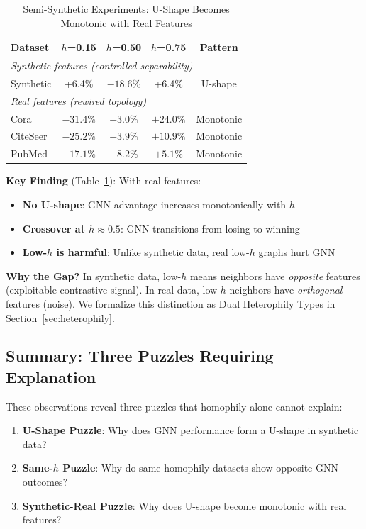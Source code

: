 \begin{table}[t]
\centering
\caption{Semi-Synthetic Experiments: U-Shape Becomes Monotonic with Real Features}
\label{tab:semi_synthetic_obs}
\begin{tabular}{@{}lcccc@{}}
\toprule
\textbf{Dataset} & \textbf{$h$=0.15} & \textbf{$h$=0.50} & \textbf{$h$=0.75} & \textbf{Pattern} \\
\midrule
\multicolumn{5}{l}{\textit{Synthetic features (controlled separability)}} \\
Synthetic & +6.4\% & $-18.6\%$ & +6.4\% & U-shape \\
\midrule
\multicolumn{5}{l}{\textit{Real features (rewired topology)}} \\
Cora & $-31.4\%$ & $+3.0\%$ & $+24.0\%$ & Monotonic \\
CiteSeer & $-25.2\%$ & $+3.9\%$ & $+10.9\%$ & Monotonic \\
PubMed & $-17.1\%$ & $-8.2\%$ & $+5.1\%$ & Monotonic \\
\bottomrule
\end{tabular}
\end{table}

\textbf{Key Finding} (Table~\ref{tab:semi_synthetic_obs}): With real features:
\begin{itemize}
    \item \textbf{No U-shape}: GNN advantage increases monotonically with $h$
    \item \textbf{Crossover at $h \approx 0.5$}: GNN transitions from losing to winning
    \item \textbf{Low-$h$ is harmful}: Unlike synthetic data, real low-$h$ graphs hurt GNN
\end{itemize}

\textbf{Why the Gap?} In synthetic data, low-$h$ means neighbors have \textit{opposite} features (exploitable contrastive signal). In real data, low-$h$ neighbors have \textit{orthogonal} features (noise). We formalize this distinction as Dual Heterophily Types in Section~\ref{sec:heterophily}.

\subsection{Summary: Three Puzzles Requiring Explanation}

These observations reveal three puzzles that homophily alone cannot explain:

\begin{enumerate}
    \item \textbf{U-Shape Puzzle}: Why does GNN performance form a U-shape in synthetic data?
    \item \textbf{Same-$h$ Puzzle}: Why do same-homophily datasets show opposite GNN outcomes?
    \item \textbf{Synthetic-Real Puzzle}: Why does U-shape become monotonic with real features?
\end{enumerate}

